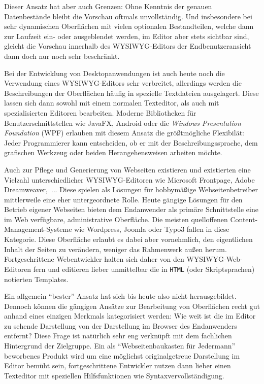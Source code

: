 Dieser Ansatz hat aber auch Grenzen: Ohne Kenntnis der genauen Datenbestände bleibt die Vorschau oftmals unvollständig. Und insbesondere bei sehr dynamischen Oberflächen mit vielen optionalen Bestandteilen, welche dann zur Laufzeit ein- oder ausgeblendet werden, im Editor aber stets sichtbar sind, gleicht die Vorschau innerhalb des WYSIWYG-Editors der Endbenutzeransicht dann doch nur noch sehr beschränkt.

Bei der Entwicklung von Desktopanwendungen ist auch heute noch die Verwendung eines WYSIWYG-Editors sehr verbreitet, allerdings werden die Beschreibungen der Oberflächen häufig in spezielle Textdateien ausgelagert. Diese lassen sich dann sowohl mit einem normalen Texteditor, als auch mit spezialisierten Editoren bearbeiten. Moderne Bibliotheken für Benutzerschnittstellen wie JavaFX, Android oder die \textit{Windows Presentation Foundation} (WPF) erlauben mit diesem Ansatz die größtmögliche Flexibilät: Jeder Programmierer kann entscheiden, ob er mit der Beschreibungssprache, dem grafischen Werkzeug oder beiden Herangehensweisen arbeiten möchte.

Auch zur Pflege und Generierung von Webseiten existieren und existierten eine Vielzahl unterschiedlicher WYSIWYG-Editoren wie Microsoft Frontpage, Adobe Dreamweaver,~... Diese spielen als Lösungen für hobbymäßige Webseitenbetreiber mittlerweile eine eher untergeordnete Rolle. Heute gängige Lösungen für den Betrieb eigener Webseiten bieten dem Endanwender als primäre Schnittstelle eine im Web verfügbare, administrative Oberfläche. Die meisten quelloffenen Content-Management-Systeme wie Wordpress, Joomla oder Typo3 fallen in diese Kategorie. Diese Oberfläche erlaubt es dabei aber vornehmlich, den eigentlichen Inhalt der Seiten zu verändern, weniger das Rahmenwerk außen herum. Fortgeschrittene Webentwickler halten sich daher von den WYSIWYG-Web-Editoren fern und editieren lieber unmittelbar die in \texttt{HTML} (oder Skriptsprachen) notierten Templates.

Ein allgemein "`bester"' Ansatz hat sich bis heute also nicht herausgebildet. Dennoch können die gängigen Ansätze zur Bearbeitung von Oberflächen recht gut anhand eines einzigen Merkmals kategorisiert werden: Wie weit ist die im Editor zu sehende Darstellung von der Darstellung im Browser des Endanwenders entfernt? Diese Frage ist natürlich sehr eng verknüpft mit dem fachlichen Hintergrund der Zielgruppe. Ein als "`Webseitenbaukasten für Jedermann"' beworbenes Produkt wird um eine möglichst originalgetreue Darstellung im Editor bemüht sein, fortgeschrittene Entwickler nutzen dann lieber einen Texteditor mit speziellen Hilfsfunktionen wie Syntaxvervollständigung.

